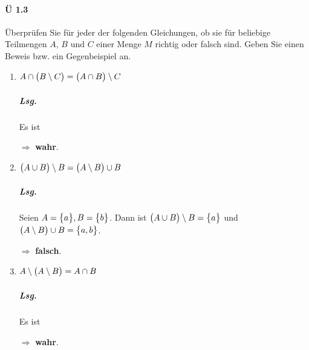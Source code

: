 \documentclass{scrreprt}
\begin{document}
\newpage
\paragraph{Ü 1.3} Überprüfen Sie für jeder der folgenden Gleichungen, ob sie
für beliebige Teilmengen $A$, $B$ und $C$ einer Menge $M$ richtig oder falsch
sind.
Geben Sie einen Beweis bzw. ein Gegenbeispiel an.

\begin{enumerate}[(1)]
\item $A \cap \qty\big(B \setminus C) = \qty\big(A \cap B) \setminus C$

  \subparagraph{Lsg.} Es ist

  $\Rightarrow$ \textbf{wahr}.

\item $\qty\big(A \cup B) \setminus B = \qty\big(A \setminus B) \cup B$

  \subparagraph{Lsg.} Seien $A = \qty\big{a}, B = \qty\big{b}$.
  Dann ist $\qty\big(A \cup B) \setminus B = \qty\big{a}$
  und $\qty\big(A \setminus B) \cup B = \qty\big{a, b}$.

  $\Rightarrow$ \textbf{falsch}.

\item $A \setminus \qty\big(A \setminus B) = A \cap B$

  \subparagraph{Lsg.} Es ist

  $\Rightarrow$ \textbf{wahr}.
\end{enumerate}
\end{document}
